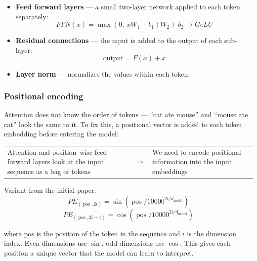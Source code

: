 \documentclass[10pt]{article}
\begin{document}
\begin{itemize}
    \item \textbf{Feed forward layers} --- a small two-layer network
    applied to each token separately:
    \begin{equation*}
        FFN(x) = \max(0,\ xW_{1} + b_{1})W_{2} + b_{2} \rightarrow GeLU 
    \end{equation*}

    \item \textbf{Residual connections} --- the input is added to the output of each sub-layer:
    \begin{equation*}
        \text{output} = F(x) + x
    \end{equation*}

    \item \textbf{Layer norm} --- normalizes the values within each token.
\end{itemize}



\subsubsection{Positional encoding}

Attention does not know the order of tokens --- ``cat ate mouse'' and ``mouse ate cat'' look the same to it. To fix this, a positional vector is added to each token embedding before entering the model:

\begin{tabular}{p{7cm} c p{7cm}} 
Attention and position--wise feed forward layers look at the input sequence as a bag of tokens & $\Rightarrow$ & We need to encode positional information into the input embeddings \\
\end{tabular}

Variant from the initial paper:
\begin{equation*} 
PE_{(\operatorname{pos},2i)}=\sin(\operatorname{pos}/10000^{2i/d_{\operatorname{model}}})
\end{equation*}
\begin{equation*} 
PE_{(\operatorname{pos},2i+1)}=\cos(\operatorname{pos}/10000^{2i/d_{\operatorname{model}}})
\end{equation*}

where $\text{pos}$ is the position of the token in the sequence
and $i$ is the dimension index. Even dimensions use $\sin$,
odd dimensions use $\cos$. This gives each position a unique
vector that the model can learn to interpret.
\end{document}
